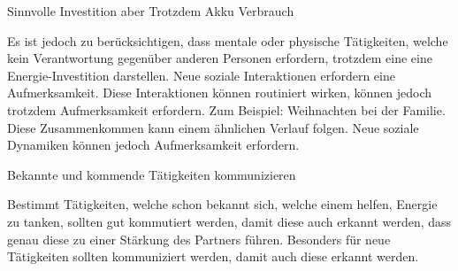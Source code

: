Sinnvolle Investition aber Trotzdem Akku Verbrauch

Es ist jedoch zu berücksichtigen, dass mentale oder physische Tätigkeiten, welche kein Verantwortung gegenüber anderen Personen erfordern, trotzdem eine eine Energie-Investition darstellen. Neue soziale Interaktionen erfordern eine Aufmerksamkeit. Diese Interaktionen können routiniert wirken, können jedoch trotzdem Aufmerksamkeit erfordern. Zum Beispiel: Weihnachten bei der Familie. Diese Zusammenkommen kann einem ähnlichen Verlauf folgen. Neue soziale Dynamiken können jedoch Aufmerksamkeit erfordern. 

Bekannte und kommende Tätigkeiten kommunizieren

Bestimmt Tätigkeiten, welche schon bekannt sich, welche einem helfen, Energie zu tanken, sollten gut kommutiert werden, damit diese auch erkannt werden, dass genau diese zu einer Stärkung des Partners führen. Besonders für neue Tätigkeiten sollten kommuniziert werden, damit auch diese erkannt werden.


